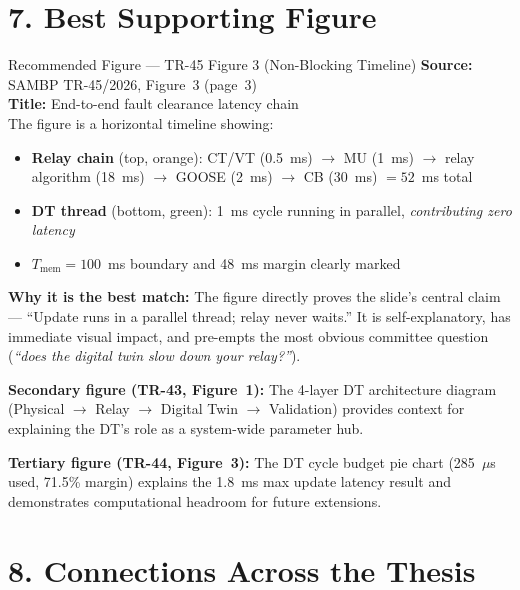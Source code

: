 \documentclass[12pt,a4paper]{article}
\begin{document}
\section{7.\; Best Supporting Figure}

\begin{keybox}{Recommended Figure — TR-45 Figure 3 (Non-Blocking Timeline)}
\textbf{Source:} SAMBP TR-45/2026, Figure~3 (page~3)\\
\textbf{Title:} End-to-end fault clearance latency chain\\[4pt]
The figure is a horizontal timeline showing:
\begin{itemize}[nosep]
  \item \textbf{Relay chain} (top, orange): CT/VT (0.5~ms) $\to$ MU (1~ms) $\to$
        relay algorithm (18~ms) $\to$ GOOSE (2~ms) $\to$ CB (30~ms) $= 52$~ms total
  \item \textbf{DT thread} (bottom, green): 1~ms cycle running in parallel,
        \emph{contributing zero latency}
  \item $T_\mathrm{mem} = 100$~ms boundary and 48~ms margin clearly marked
\end{itemize}
\textbf{Why it is the best match:} The figure directly proves the slide's central
claim — ``Update runs in a parallel thread; relay never waits.'' It is
self-explanatory, has immediate visual impact, and pre-empts the most obvious
committee question (\textit{``does the digital twin slow down your relay?''}).
\end{keybox}

\noindent\textbf{Secondary figure (TR-43, Figure~1):} The 4-layer DT architecture
diagram (Physical $\to$ Relay $\to$ Digital Twin $\to$ Validation) provides context
for explaining the DT's role as a system-wide parameter hub.

\noindent\textbf{Tertiary figure (TR-44, Figure~3):} The DT cycle budget pie chart
(285~$\mu$s used, 71.5\% margin) explains the 1.8~ms max update latency result and
demonstrates computational headroom for future extensions.

\section{8.\; Connections Across the Thesis}
\end{document}
